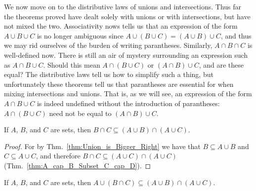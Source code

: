         We now move on to the distributive laws of unions and intersections.
        Thus far the theorems proved have dealt solely with unions or with
        intersections, but have not mixed the two. Associativity nows tells us
        that an expression of the form $A\cup{B}\cup{C}$ is no longer
        ambiguous since $A\cup(B\cup{C})=(A\cup{B})\cup{C}$, and thus we may rid
        ourselves of the burden of writing parantheses. Similarly,
        $A\cap{B}\cap{C}$ is well-defined now. There is still an air of mystery
        surrounding an expression such as $A\cap{B}\cup{C}$. Should this mean
        $A\cap(B\cup{C})$ or $(A\cap{B})\cup{C}$, and are these equal? The
        distributive laws tell us how to simplify such a thing, but
        unfortunately these theorems tell us that parantheses are essential for
        when mixing intersections and unions. That is, as we will see, an
        expression of the form $A\cap{B}\cup{C}$ is indeed undefined without
        the introduction of parantheses: $A\cap(B\cup{C})$ need not be equal to
        $(A\cap{B})\cup{C}$.
        \begin{theorem}
            \label{thm:First_Pseudo_Dist_Law_Union}%
            If $A$, $B$, and $C$ are sets, then
            $B\cap{C}\subseteq(A\cup{B})\cap(A\cup{C})$.
        \end{theorem}
        \begin{proof}
            For by Thm.~\ref{thm:Union_is_Bigger_Right} we have that
            $B\subseteq{A}\cup{B}$ and $C\subseteq{A}\cup{C}$, and therefore
            $B\cap{C}\subseteq(A\cup{C})\cap(A\cup{C})$
            (Thm.~\ref{thm:A_cap_B_Subset_C_cap_D}).
        \end{proof}
        \begin{theorem}
            \label{thm:Second_Pseudo_Dist_Law_Union}%
            If $A$, $B$, and $C$ are sets, then
            $A\cup(B\cap{C})\subseteq(A\cup{B})\cap(A\cup{C})$.
        \end{theorem}
